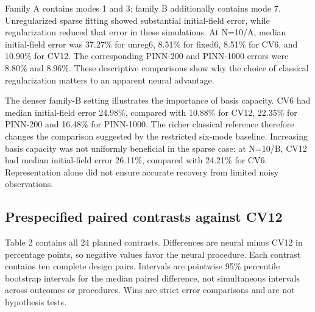 \documentclass[10pt,a4paper]{article}
\begin{document}
Family A contains modes 1 and 3; family B additionally contains mode 7.
Unregularized sparse fitting showed substantial initial-field error, while
regularization reduced that error in these simulations. At N=10/A, median
initial-field error was 37.27\% for unreg6, 8.51\% for fixed6, 8.51\% for CV6,
and 10.90\% for CV12. The corresponding PINN-200 and PINN-1000 errors were
8.80\% and 8.96\%. These descriptive comparisons show why the choice of classical
regularization matters to an apparent neural advantage.

The denser family-B setting illustrates the importance of basis capacity.
CV6 had median initial-field error 24.98\%, compared with 10.88\% for CV12,
22.35\% for PINN-200 and 16.48\% for PINN-1000. The richer classical reference
therefore changes the comparison suggested by the restricted six-mode baseline.
Increasing basis capacity was not uniformly beneficial in the sparse case:
at N=10/B, CV12 had median initial-field error 26.11\%, compared with 24.21\%
for CV6. Representation alone did not ensure accurate recovery from limited
noisy observations.

\subsection{Prespecified paired contrasts against CV12}

Table 2 contains all 24 planned contrasts. Differences are neural minus CV12
in percentage points, so negative values favor the neural procedure. Each
contrast contains ten complete design pairs. Intervals are pointwise 95\%
percentile bootstrap intervals for the median paired difference, not simultaneous
intervals across outcomes or procedures. Wins are strict error comparisons and
are not hypothesis tests.
\end{document}
